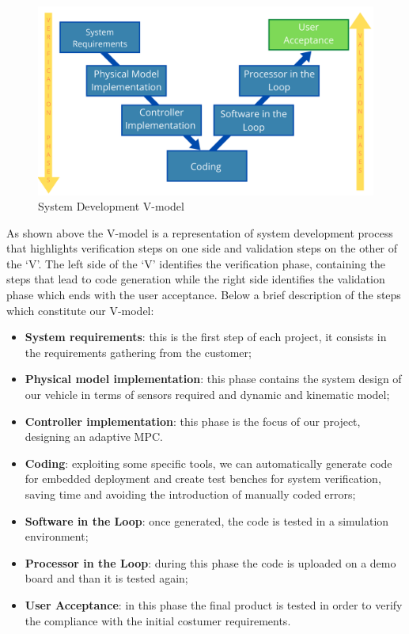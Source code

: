\begin{figure}[H]
    \centering
    \includegraphics[width=1\textwidth]{Figures/V-MODEL.png}
    \caption{System Development V-model}
    
    \label{fig:V_model}
\end{figure}

As shown above the V-model is a representation of system development process that highlights verification steps on one side and validation steps on the other of the ‘V’. The left side of the ‘V’ identifies the verification phase, containing the steps that lead to code generation while the right side identifies the validation phase which ends with the user acceptance.
Below a brief description of the steps which constitute our V-model:
\begin{itemize}
    \item \textbf{System requirements}: this is the first step of each project, it consists in the requirements gathering from the customer;
    \item \textbf{Physical model implementation}: this phase contains the system design of our vehicle in terms of sensors required and dynamic and kinematic model;
    \item \textbf{Controller implementation}: this phase is the focus of our project, designing an adaptive MPC. 
    \item \textbf{Coding}: exploiting some specific tools, we can automatically generate code for embedded deployment and create test benches for system verification, saving time and avoiding the introduction of manually coded errors;
    \item \textbf{Software in the Loop}: once generated, the code is tested in a simulation environment;
    
    \item \textbf{Processor in the Loop}: during this phase the code is uploaded on a demo board and than it is tested again;
    
    \item \textbf{User Acceptance}: in this phase the final product is tested in order to verify the compliance with the initial costumer requirements.
\end{itemize}

